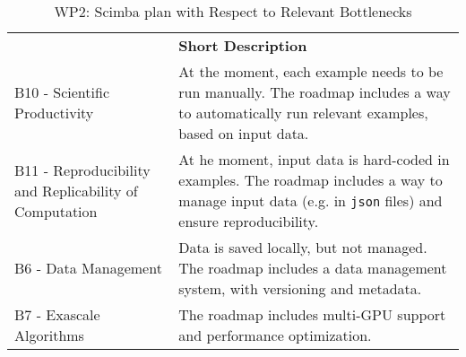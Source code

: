 \begin{table}[h!]
    \centering
    {
        \setlength{\parindent}{0pt}
        \def\arraystretch{1.25}
        {
            \fontsize{9}{11}\selectfont
            \begin{tabular}{!{\color{numpexgray}\vrule}p{.25\linewidth}!{\color{numpexgray}\vrule}p{.6885\linewidth}!{\color{numpexgray}\vrule}}

                 & {\rule{0pt}{2.5ex}\color{white}\bf Short Description } \\

                B10 - Scientific Productivity
                 & At the moment, each example needs to be run manually.
                The roadmap includes a way to automatically
                run relevant examples, based on input data.               \\
                B11 - Reproducibility and Replicability of Computation
                 & At he moment, input data is hard-coded in examples.
                The roadmap includes a way to manage input data
                (e.g. in \texttt{json} files)
                and ensure reproducibility.                               \\
                B6 - Data Management
                 & Data is saved locally, but not managed.
                The roadmap includes a data management system,
                with versioning and metadata.                             \\
                B7 - Exascale Algorithms
                 & The roadmap includes multi-GPU support
                and performance optimization.                             \\
            \end{tabular}
        }
    }
    \caption{WP2: Scimba plan with Respect to Relevant Bottlenecks}
    \label{tab:WP2:Scimba:bottlenecks}
\end{table}
